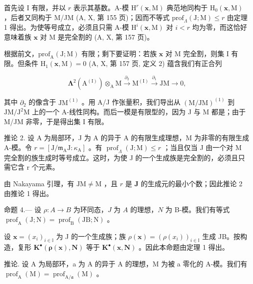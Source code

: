 首先设 I 有限，并以 \(r\) 表示其基数。A-模 \(\mathrm{H}^r (\mathbf{x},\mathrm{M})\) 典范地同构于 \(\mathrm{H}_0(\mathbf{x},\mathrm{M})\) ，后者又同构于 M/JM (A, X, 第 155 页)；因而不等式 \(\mathrm{prof}_{\Lambda}(\mathrm{J};\mathrm{M})\leqslant r\) 由定理 1 得出。为使等号成立，必须且只需 A-模 \(\mathrm{H}^i (\mathbf{x},\mathrm{M})\) 对 \(i < r\) 均为零，而这恰好意味着族 \(\mathbf{x}\) 对 M 是完全割的 (A, X, 第 157 页)。

根据前文，\(\mathrm{prof}_{\mathrm{A}}(\mathrm{J};\mathrm{M})\) 有限；剩下要证明：若族 \(\mathbf{x}\) 对 M 完全割，则集 I 有限。但条件 \(\mathrm{H}_{1}(\mathbf{x},\mathrm{M}) = 0\) (A, X, 第 157 页, 定义 2) 蕴含我们有正合列

\[
\boldsymbol {\Lambda} ^ {2} (\mathrm{A} ^ {(\mathrm{I})}) \otimes_ {\mathrm{A}} \mathrm{M} \xrightarrow {\partial_ {2}} \mathrm{M} ^ {(\mathrm{I})} \xrightarrow {\partial_ {1}} \mathrm{JM} \to 0,
\]

其中 \(\partial_{2}\) 的像含于 \(\mathrm{JM}^{(1)}\) 。用 A/J 作张量积，我们导出从 \((\mathrm{M} / \mathrm{JM})^{(1)}\) 到 \(\mathrm{JM} / \mathrm{J}^2\mathrm{M}\) 上的一个 A-线性同构。而后一模是有限型的，因为 J 与 M 都是；由于 M/JM 非零，于是得出集 I 有限。

推论 2. 设 A 为局部环，J 为 A 的异于 A 的有限生成理想，M 为非零的有限生成 A-模。令 \(r = [\mathrm{J} / \mathfrak{m}_{\mathrm{A}}\mathrm{J} : \kappa_{\mathrm{A}}]\) 。有 \(\operatorname{prof}_{\Lambda}(\mathrm{J};\mathrm{M}) \leqslant r\) ；当且仅当 J 由一个对 M 完全割的族生成时等号成立。这时，为使 J 的一个生成族是完全割的，必须且只需它含 r 个元素。

由 Nakayama 引理，有 \(\mathrm{JM} \neq \mathrm{M}\) ，且 \(r\) 是 \(\mathbf{J}\) 的生成元的最小个数；因此推论 2 由推论 1 得出。

命题 4.--- 设 \(\rho: A \to B\) 为环同态，\(J\) 为 \(A\) 的理想，\(N\) 为 B-模。我们有等式 \(\operatorname{prof}_{\mathrm{A}}(\mathrm{J}; \mathrm{N}) = \operatorname{prof}_{\mathrm{B}}(\mathrm{JB}; \mathrm{N})\) 。

设 \(\mathbf{x} = (x_{i})_{i \in \mathbb{I}}\) 为 J 的一个生成族；族 \(\rho(\mathbf{x}) = (\rho(x_{i}))_{i \in \mathbb{I}}\) 生成 JB。按构造，复形 \(\mathbf{K}^{\bullet}(\boldsymbol{\rho}(\mathbf{x}), \mathbf{N})\) 等于 \(\mathbf{K}^{\bullet}(\mathbf{x}, \mathbf{N})\) 。因此本命题由定理 1 得出。

推论. 设 A 为局部环，a 为 A 的异于 A 的理想，M 为被 a 零化的 A-模。我们有 \(\operatorname{prof}_{\mathrm{A}}(\mathrm{M}) = \operatorname{prof}_{\mathrm{A}/\mathfrak{a}}(\mathrm{M})\) 。

